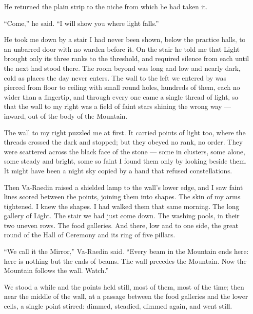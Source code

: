 He returned the plain strip to the niche from which he had taken it.\par

``Come,'' he said. ``I will show you where light falls.''\par

\ornament

He took me down by a stair I had never been shown, below the practice halls, to an unbarred door with no warden before it. On the stair he told me that Light brought only its three ranks to the threshold, and required silence from each until the next had stood there. The room beyond was long and low and nearly dark, cold as places the day never enters. The wall to the left we entered by was pierced from floor to ceiling with small round holes, hundreds of them, each no wider than a fingertip, and through every one came a single thread of light, so that the wall to my right was a field of faint stars shining the wrong way --- inward, out of the body of the Mountain.\par

The wall to my right puzzled me at first. It carried points of light too, where the threads crossed the dark and stopped; but they obeyed no rank, no order. They were scattered across the black face of the stone --- some in clusters, some alone, some steady and bright, some so faint I found them only by looking beside them. It might have been a night sky copied by a hand that refused constellations.\par

Then Va-Raedin raised a shielded lamp to the wall's lower edge, and I saw faint lines scored between the points, joining them into shapes. The skin of my arms tightened. I knew the shapes. I had walked them that same morning. The long gallery of Light. The stair we had just come down. The washing pools, in their two uneven rows. The food galleries. And there, low and to one side, the great round of the Hall of Ceremony and its ring of five pillars.\par

``We call it the Mirror,'' Va-Raedin said. ``Every beam in the Mountain ends here: here is nothing but the ends of beams. The wall precedes the Mountain. Now the Mountain follows the wall. Watch.''\par

We stood a while and the points held still, most of them, most of the time; then near the middle of the wall, at a passage between the food galleries and the lower cells, a single point stirred: dimmed, steadied, dimmed again, and went still.\par

